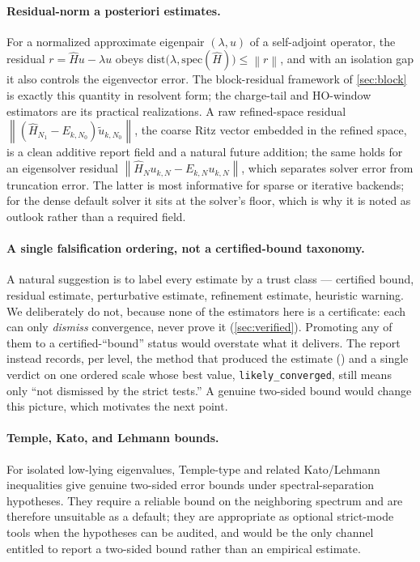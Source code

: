 \documentclass[11pt,a4paper]{article}
\newcommand{\norm}[1]{\left\lVert#1\right\rVert}
\newcommand{\Hhat}{\widehat H}
\newcommand{\code}[1]{\texttt{\detokenize{#1}}}
\begin{document}
\paragraph{Residual-norm a posteriori estimates.}
For a normalized approximate eigenpair $(\lambda,u)$ of a self-adjoint operator, the residual $r=\Hhat u-\lambda u$ obeys $\mathrm{dist}\!\big(\lambda,\mathrm{spec}(\Hhat)\big)\le\norm{r}$, and with an isolation gap it also controls the eigenvector error.  The block-residual framework of \cref{sec:block} is exactly this quantity in resolvent form; the charge-tail and HO-window estimators are its practical realizations.  A raw refined-space residual $\norm{(\Hhat_{N_1}-E_{k,N_0})\tilde u_{k,N_0}}$, the coarse Ritz vector embedded in the refined space, is a clean additive report field and a natural future addition; the same holds for an eigensolver residual $\norm{\Hhat_N u_{k,N}-E_{k,N}u_{k,N}}$, which separates solver error from truncation error.  The latter is most informative for sparse or iterative backends; for the dense default solver it sits at the solver's floor, which is why it is noted as outlook rather than a required field.

\paragraph{A single falsification ordering, not a certified-bound taxonomy.}
A natural suggestion is to label every estimate by a trust class --- certified bound, residual estimate, perturbative estimate, refinement estimate, heuristic warning.  We deliberately do not, because none of the estimators here is a certificate: each can only \emph{dismiss} convergence, never prove it (\cref{sec:verified}).  Promoting any of them to a certified-``bound'' status would overstate what it delivers.  The report instead records, per level, the method that produced the estimate (\code{estimator_method}) and a single verdict on one ordered scale whose best value, \texttt{likely\_converged}, still means only ``not dismissed by the strict tests.''  A genuine two-sided bound would change this picture, which motivates the next point.

\paragraph{Temple, Kato, and Lehmann bounds.}
For isolated low-lying eigenvalues, Temple-type and related Kato/Lehmann inequalities give genuine two-sided error bounds under spectral-separation hypotheses.  They require a reliable bound on the neighboring spectrum and are therefore unsuitable as a default; they are appropriate as optional strict-mode tools when the hypotheses can be audited, and would be the only channel entitled to report a two-sided bound rather than an empirical estimate.
\end{document}
